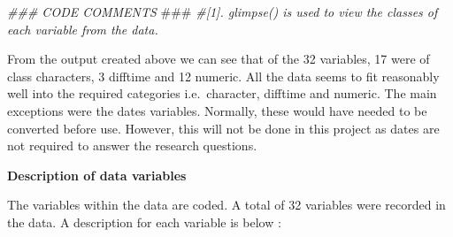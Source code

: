 \documentclass[
]{book}
\newenvironment{Shaded}{\begin{snugshade}}{\end{snugshade}}
\newcommand{\AlertTok}[1]{\textcolor[rgb]{0.94,0.16,0.16}{#1}}
\newcommand{\CommentTok}[1]{\textcolor[rgb]{0.56,0.35,0.01}{\textit{#1}}}
\begin{document}
\begin{Shaded}
\begin{Highlighting}[]
\CommentTok{### CODE COMMENTS }\AlertTok{###}
\CommentTok{#[1]. glimpse() is used to view the classes of each variable from the data. }
\end{Highlighting}
\end{Shaded}

From the output created above we can see that of the 32 variables, 17 were of class characters, 3 difftime and 12 numeric. All the data seems to fit reasonably well into the required categories i.e.~character, difftime and numeric. The main exceptions were the dates variables. Normally, these would have needed to be converted before use. However, this will not be done in this project as dates are not required to answer the research questions.

\textbf{Description of data variables}

The variables within the data are coded. A total of 32 variables were recorded in the data. A description for each variable is below :
\end{document}
